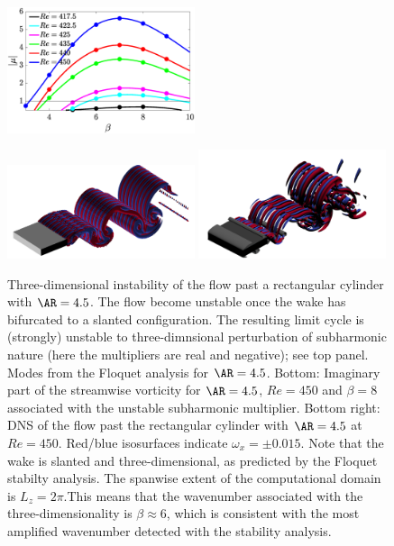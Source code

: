 \documentclass{jfm}
\begin{document}
\begin{figure}
\centering
\includegraphics[width=0.49\textwidth]{./fig/AR4p5/multipliers_3D.eps}
\vspace{0.1cm}
\vspace{0.1cm}
\includegraphics[trim={0 0 0 0},clip,width=0.49\textwidth]{./fig/AR4p5/Floqetmode_beta_8_Re450_AR4p5.png}
\includegraphics[width=0.49\textwidth]{./fig/AR4p5/lambda2_omegax-3D-Re450b.png}
\caption{Three-dimensional instability of the flow past a rectangular cylinder with $\AR=4.5$. The flow become unstable once the wake has bifurcated to a slanted configuration. The resulting limit cycle is (strongly) unstable to three-dimnsional perturbation of subharmonic nature (here the multipliers are real and negative); see top panel. Modes from the Floquet analysis for $\AR=4.5$. Bottom: Imaginary part of the streamwise vorticity for $\AR=4.5$, $Re=450$ and $\beta=8$ associated with the unstable subharmonic multiplier. Bottom right: DNS of the flow past the rectangular cylinder with $\AR=4.5$ at $Re=450$. Red/blue isosurfaces indicate $\omega_x = \pm 0.015$. Note that the wake is slanted and three-dimensional, as predicted by the Floquet stabilty analysis. The spanwise extent of the computational domain is $L_z=2\pi$.This means that the wavenumber associated with the three-dimensionality is $\beta \approx 6$, which is consistent with the most amplified wavenumber detected with the stability analysis.}
\label{fig:AR4p5_modes_Re430_beta0}
\end{figure}
\end{document}
